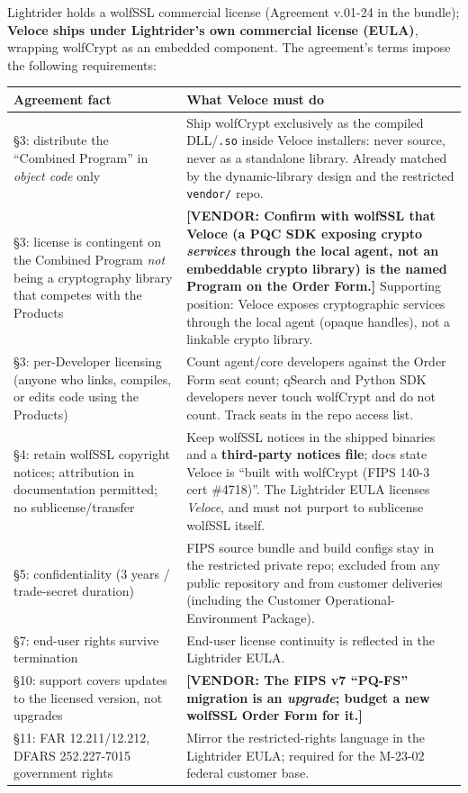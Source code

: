 \documentclass[10pt]{article}
\newcommand{\dep}[1]{\textcolor{warnred}{\sffamily\bfseries\small [VENDOR: #1]}}
\newcommand{\code}[1]{\texttt{\small #1}}
\begin{document}
Lightrider holds a wolfSSL commercial license (Agreement v.01-24 in the bundle);
\textbf{Veloce ships under Lightrider's own commercial license (EULA)}, wrapping wolfCrypt
as an embedded component. The agreement's terms impose the following requirements:

\begin{small}
\begin{tabularx}{\textwidth}{@{}>{\raggedright\arraybackslash}p{}L@{}}
\toprule
\textbf{Agreement fact} & \textbf{What Veloce must do} \\
\midrule
\S3: distribute the ``Combined Program'' in \emph{object code} only &
  Ship wolfCrypt exclusively as the compiled DLL/\code{.so} inside Veloce installers:
  never source, never as a standalone library. Already matched by the dynamic-library
  design and the restricted \code{vendor/} repo. \\
\S3: license is contingent on the Combined Program \emph{not} being a cryptography
  library that competes with the Products &
  \dep{Confirm with wolfSSL that Veloce (a PQC SDK exposing crypto \emph{services}
  through the local agent, not an embeddable crypto library) is the named Program on the
  Order Form.} Supporting position: Veloce exposes cryptographic services through the
  local agent (opaque handles), not a linkable crypto library. \\
\S3: per-Developer licensing (anyone who links, compiles, or edits code using the
  Products) &
  Count agent/core developers against the Order Form seat count; qSearch and Python SDK
  developers never touch wolfCrypt and do not count. Track seats in the repo access list. \\
\S4: retain wolfSSL copyright notices; attribution in documentation permitted;
  no sublicense/transfer &
  Keep wolfSSL notices in the shipped binaries and a \textbf{third-party notices file};
  docs state Veloce is ``built with wolfCrypt (FIPS 140-3 cert \#4718)''. The Lightrider
  EULA licenses \emph{Veloce}, and must not purport to sublicense wolfSSL itself. \\
\S5: confidentiality (3 years / trade-secret duration) &
  FIPS source bundle and build configs stay in the restricted private repo; excluded from
  any public repository and from customer deliveries (including the
  Customer Operational-Environment Package). \\
\S7: end-user rights survive termination &
  End-user license continuity is reflected in the Lightrider EULA. \\
\S10: support covers updates to the licensed version, not upgrades &
  \dep{The FIPS v7 ``PQ-FS'' migration is an \emph{upgrade}; budget a new
  wolfSSL Order Form for it.} \\
\S11: FAR 12.211/12.212, DFARS 252.227-7015 government rights &
  Mirror the restricted-rights language in the Lightrider EULA; required for the
  M-23-02 federal customer base. \\
\bottomrule
\end{tabularx}
\end{small}
\end{document}
